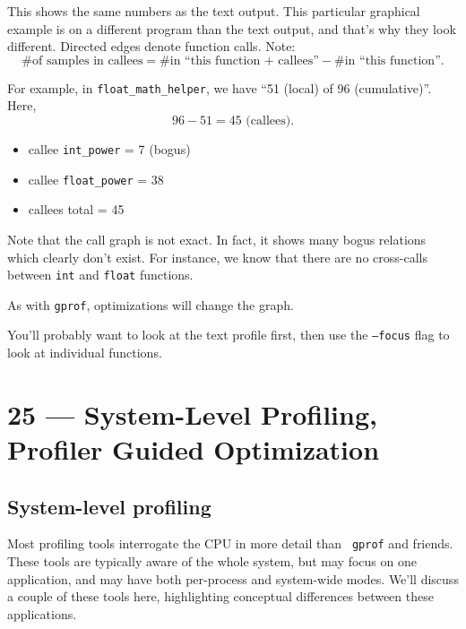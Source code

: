 \documentclass[a4paper]{report}
\begin{document}
This shows the same numbers as the text output. This particular graphical example is on a different program than the text output, and that's why they look different. Directed edges denote function calls.
Note: 
\[ \mbox{\# of samples in callees} = \mbox{\# in ``this function + callees''} - \mbox{\# in ``this function''}.\]

For example, in {\tt float\_math\_helper}, we have ``51 (local) of 96 (cumulative)''.
Here,
\[ 96 - 51 = 45 \mbox{ (callees)}. \]
      \begin{itemize}
        \item callee {\tt int\_power} = 7 (bogus)
        \item callee {\tt float\_power} = 38
        \item callees total = 45
      \end{itemize}

Note that the call graph is not exact.
In fact, it shows many bogus relations which clearly don't exist.
For instance, we know that there are no cross-calls between {\tt int} and {\tt float} functions.

As with {\tt gprof}, optimizations will change the
      graph.\

You'll probably want to look at the text profile first, then use the
      {\tt --focus} flag to look at individual functions.










\chapter*{25 --- System-Level Profiling, Profiler Guided Optimization}


      \section*{System-level profiling}
Most profiling tools interrogate the CPU in more detail than {\tt
  gprof} and friends. These tools are typically aware of the whole
system, but may focus on one application, and may have both
per-process and system-wide modes. We'll discuss a couple of these
tools here, highlighting conceptual differences between these
applications.
\end{document}
